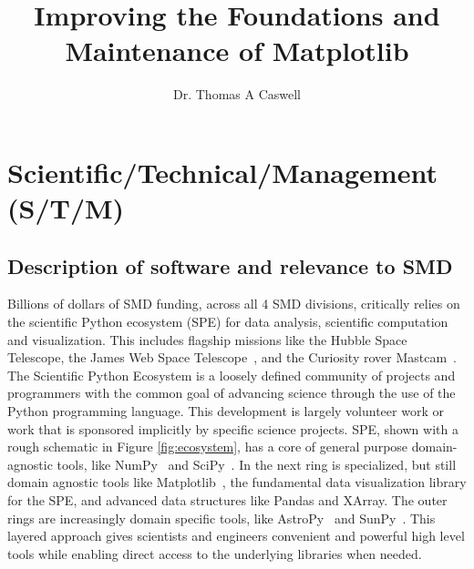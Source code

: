 \documentclass[12pt]{article}
\numberwithin{page}{section}
\begin{document}
\title{Improving the Foundations and Maintenance of Matplotlib}
\author{Dr. Thomas A Caswell}
\date{}
\maketitle

\setcounter{tocdepth}{2}
\tableofcontents
\thispagestyle{empty}
\newpage

\section{Scientific/Technical/Management (S/T/M)}
\setcounter{page}{1}

\subsection{Description of software and relevance to SMD}

Billions of dollars of SMD funding, across all 4 SMD divisions,
critically relies on the scientific Python ecosystem (SPE) for data
analysis, scientific computation and visualization.  This includes
flagship missions like the Hubble Space Telescope, the James Web Space
Telescope~\cite{jwst_pipeline}, and the Curiosity rover
Mastcam~\cite{https://doi.org/10.1002/2016EA000219}.  The Scientific
Python Ecosystem is a loosely defined community of projects and
programmers with the common goal of advancing science through the use
of the Python programming language.  This development is largely
volunteer work or work that is sponsored implicitly by specific
science projects.  SPE, shown with a rough schematic in Figure
\ref{fig:ecosystem}, has a core of general purpose domain-agnostic
tools, like NumPy~\cite{Harris2020} and SciPy~\cite{Virtanen2020}. In
the next ring is specialized, but still domain agnostic tools like
Matplotlib~\cite{Hunter:2007}, the fundamental data visualization
library for the SPE, and advanced data structures like Pandas and
XArray.  The outer rings are increasingly domain specific tools, like
AstroPy~\cite{robitaille2013astropy} and
SunPy~\cite{sunpy_community2020}.  This layered approach gives
scientists and engineers convenient and powerful high level tools
while enabling direct access to the underlying libraries when needed.
\end{document}
